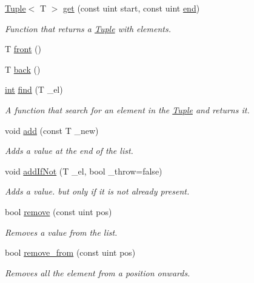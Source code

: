 \begin{DoxyCompactItemize}
\mbox{\hyperlink{class_tuple}{Tuple}}$<$ T $>$ \mbox{\hyperlink{class_tuple_a7cd0c2fb33a5861e3f171614881393ce}{get}} (const uint start, const uint \mbox{\hyperlink{class_tuple_a345d8a3efbf58fe4cc7295c3cf66e8ab}{end}})
\begin{DoxyCompactList}\small\item\em Function that returns a {\ttfamily \mbox{\hyperlink{class_tuple}{Tuple}}} with elements. \end{DoxyCompactList}\item 
T \mbox{\hyperlink{class_tuple_a3f97540a70c1e40e3a34c1b5dee9fa0e}{front}} ()
\item 
T \mbox{\hyperlink{class_tuple_ad885e206e13107c8f4c6005216f5da29}{back}} ()
\item 
\mbox{\hyperlink{draw_8hh_aa620a13339ac3a1177c86edc549fda9b}{int}} \mbox{\hyperlink{class_tuple_aab743167e9fd750f71add11b1aa48f6b}{find}} (T \+\_\+el)
\begin{DoxyCompactList}\small\item\em A function that search for an element in the {\ttfamily \mbox{\hyperlink{class_tuple}{Tuple}}} and returns it. \end{DoxyCompactList}\item 
void \mbox{\hyperlink{class_tuple_a5d3ee2809d790543195a6e2075aef7d0}{add}} (const T \+\_\+new)
\begin{DoxyCompactList}\small\item\em Adds a value at the end of the list. \end{DoxyCompactList}\item 
void \mbox{\hyperlink{class_tuple_ac7699d6813e11c18f436098e9f76ebf0}{add\+If\+Not}} (T \+\_\+el, bool \+\_\+throw=false)
\begin{DoxyCompactList}\small\item\em Adds a value. but only if it is not already present. \end{DoxyCompactList}\item 
bool \mbox{\hyperlink{class_tuple_ad7436ece54558c2940f79c539f83f611}{remove}} (const uint pos)
\begin{DoxyCompactList}\small\item\em Removes a value from the list. \end{DoxyCompactList}\item 
bool \mbox{\hyperlink{class_tuple_a60370cde243871dfafb0ac96404c6f90}{remove\+\_\+from}} (const uint pos)
\begin{DoxyCompactList}\small\item\em Removes all the element from a position onwards. \end{DoxyCompactList}\item 

\end{DoxyCompactItemize}
